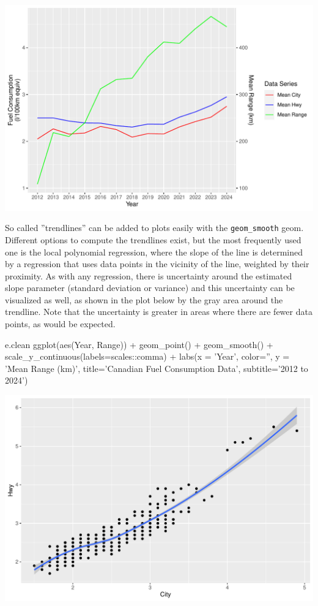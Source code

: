 \begin{center}
  \includegraphics[width=.8\textwidth]{fuel.linesTwoScales.pdf}
\end{center}

So called ''trendlines''  can be added to plots easily with the \texttt{geom\_smooth} geom. Different options to compute the trendlines exist, but the most frequently used one is the local polynomial regression, where the slope of the line is determined by a regression that uses data points in the vicinity of the line, weighted by their proximity. As with any regression, there is uncertainty around the estimated slope parameter (standard deviation or variance) and this uncertainty can be visualized as well, as shown in the plot below by the gray area around the trendline. Note that the uncertainty is greater in areas where there are fewer data points, as would be expected.

\begin{samepage}
\begin{Rcode}
e.clean %
  ggplot(aes(Year, Range)) +
    geom_point() +
    geom_smooth() +
    scale_y_continuous(labels=scales::comma) + 
    labs(x = 'Year', color='', y = 'Mean Range (km)', 
         title='Canadian Fuel Consumption Data', 
         subtitle='2012 to 2024')
\end{Rcode}
\end{samepage}

\begin{center}
  \includegraphics[width=.8\textwidth]{fuel.linesSmooth.pdf}
\end{center}

